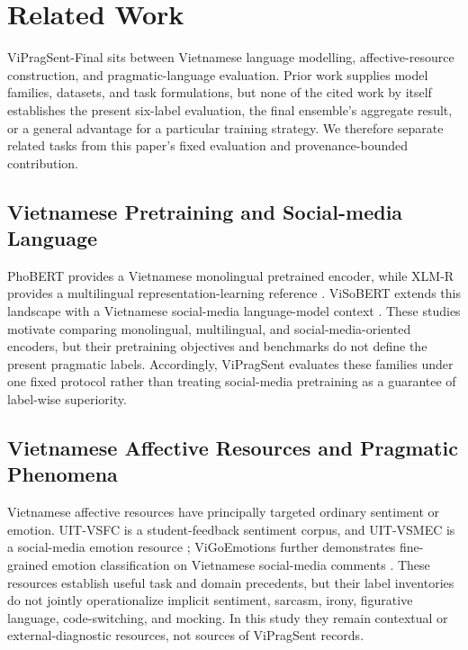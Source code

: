\section{Related Work}
\label{sec:related-work}

ViPragSent-Final sits between Vietnamese language modelling, affective-resource construction, and pragmatic-language evaluation. Prior work supplies model families, datasets, and task formulations, but none of the cited work by itself establishes the present six-label evaluation, the final ensemble's aggregate result, or a general advantage for a particular training strategy. We therefore separate related tasks from this paper's fixed evaluation and provenance-bounded contribution.

\subsection{Vietnamese Pretraining and Social-media Language}

PhoBERT provides a Vietnamese monolingual pretrained encoder, while XLM-R provides a multilingual representation-learning reference \citep{nguyen-tuan-nguyen-2020-phobert,conneau-etal-2020-unsupervised}. ViSoBERT extends this landscape with a Vietnamese social-media language-model context \citep{nguyen-etal-2023-visobert}. These studies motivate comparing monolingual, multilingual, and social-media-oriented encoders, but their pretraining objectives and benchmarks do not define the present pragmatic labels. Accordingly, ViPragSent evaluates these families under one fixed protocol rather than treating social-media pretraining as a guarantee of label-wise superiority.

\subsection{Vietnamese Affective Resources and Pragmatic Phenomena}

Vietnamese affective resources have principally targeted ordinary sentiment or emotion. UIT-VSFC is a student-feedback sentiment corpus, and UIT-VSMEC is a social-media emotion resource \citep{nguyen-etal-2018-uit-vsfc,ho-etal-2020-uit-vsmec}; ViGoEmotions further demonstrates fine-grained emotion classification on Vietnamese social-media comments \citep{tran-etal-2026-vigoemotions}. These resources establish useful task and domain precedents, but their label inventories do not jointly operationalize implicit sentiment, sarcasm, irony, figurative language, code-switching, and mocking. In this study they remain contextual or external-diagnostic resources, not sources of ViPragSent records.


